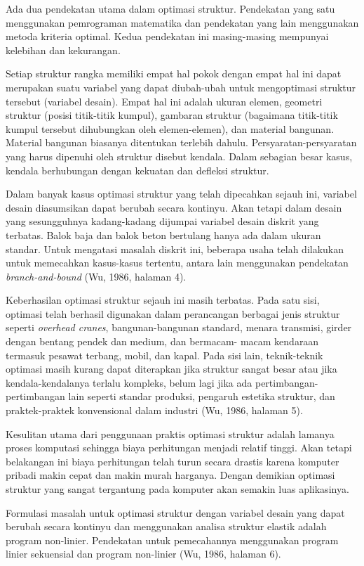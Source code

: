 Ada dua pendekatan utama dalam optimasi struktur. Pendekatan yang satu
menggunakan pemrograman matematika dan pendekatan yang lain menggunakan
metoda kriteria optimal. Kedua pendekatan ini masing-masing mempunyai
kelebihan dan kekurangan.

Setiap struktur rangka memiliki empat hal pokok dengan empat hal ini
dapat merupakan suatu variabel yang dapat diubah-ubah untuk mengoptimasi
struktur tersebut (variabel desain). Empat hal ini adalah ukuran elemen,
geometri struktur (posisi titik-titik kumpul), gambaran struktur
(bagaimana titik-titik kumpul tersebut dihubungkan oleh elemen-elemen),
dan material bangunan. Material bangunan biasanya ditentukan terlebih
dahulu. Persyaratan-persyaratan yang harus dipenuhi oleh struktur disebut
kendala. Dalam sebagian besar kasus, kendala berhubungan dengan kekuatan
dan defleksi struktur.

Dalam banyak kasus optimasi struktur yang telah dipecahkan sejauh ini,
variabel desain diasumsikan dapat berubah secara kontinyu. Akan tetapi
dalam desain yang sesungguhnya kadang-kadang dijumpai variabel desain
diskrit yang terbatas. Balok baja dan balok beton bertulang hanya ada
dalam ukuran standar. Untuk mengatasi masalah diskrit ini, beberapa usaha
telah dilakukan untuk memecahkan kasus-kasus tertentu, antara lain
menggunakan pendekatan \textit{branch-and-bound} (Wu, 1986, halaman 4).

Keberhasilan optimasi struktur sejauh ini masih terbatas. Pada satu sisi,
optimasi telah berhasil digunakan dalam perancangan berbagai jenis
struktur seperti \textit{overhead cranes}, bangunan-bangunan standard,
menara transmisi, girder dengan bentang pendek dan medium, dan bermacam-
macam kendaraan termasuk pesawat terbang, mobil, dan kapal. Pada sisi
lain, teknik-teknik optimasi masih kurang dapat diterapkan jika struktur
sangat besar atau jika kendala-kendalanya terlalu kompleks, belum lagi
jika ada pertimbangan-pertimbangan lain seperti standar produksi,
pengaruh estetika struktur, dan praktek-praktek konvensional dalam
industri (Wu, 1986, halaman 5).

Kesulitan utama dari penggunaan praktis optimasi struktur adalah lamanya
proses komputasi sehingga biaya perhitungan menjadi relatif tinggi. Akan
tetapi belakangan ini biaya perhitungan telah turun secara drastis karena
komputer pribadi makin cepat dan makin murah harganya. Dengan demikian
optimasi struktur yang sangat tergantung pada komputer akan semakin luas
aplikasinya.

Formulasi masalah untuk optimasi struktur dengan variabel desain yang
dapat berubah secara kontinyu dan menggunakan analisa struktur elastik
adalah program non-linier. Pendekatan untuk pemecahannya menggunakan
program linier sekuensial dan program non-linier (Wu, 1986, halaman 6).

